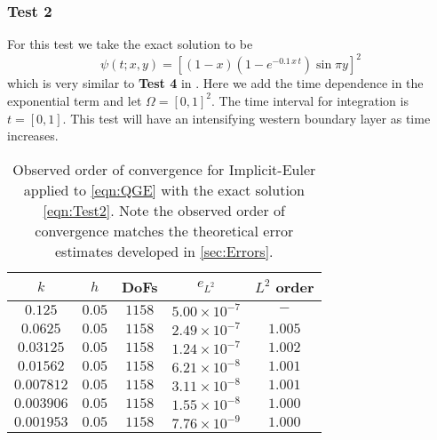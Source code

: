 \subsubsection*{Test 2}
For this test we take the exact solution to be
\begin{equation}
  \psi(t;x,y) = \left[(1-x)\left(1-e^{-0.1\,x\,t}\right) \sin \pi y\right]^2
  \label{eqn:Test2}
\end{equation}
which is very similar to \textbf{Test 4} in \cite{Foster}. Here we add the time
dependence in the exponential term and let $\Omega = [0,1]^2$. The time interval
for integration is $t = [0,1]$. This test will have an intensifying western
boundary layer as time increases.
\begin{table}
\begin{center}
  \begin{tabular}{|c|c|c|c|c|}
    \hline
    $k$ & $h$ & DoFs & $e_{L^2}$ & $L^2$ order \\%
    \hline
$0.125$ & $0.05$ & $1158$ & $5.00\times 10^{-7}$ & $-$ \\%
$0.0625$ & $0.05$ & $1158$ & $2.49\times 10^{-7}$ & $1.005$ \\%
$0.03125$ & $0.05$ & $1158$ & $1.24\times 10^{-7}$ & $1.002$ \\%
$0.01562$ & $0.05$ & $1158$ & $6.21\times 10^{-8}$ & $1.001$ \\%
$0.007812$ & $0.05$ & $1158$ & $3.11\times 10^{-8}$ & $1.001$ \\%
$0.003906$ & $0.05$ & $1158$ & $1.55\times 10^{-8}$ & $1.000$ \\%
$0.001953$ & $0.05$ & $1158$ & $7.76\times 10^{-9}$ & $1.000$ \\%
    \hline
  \end{tabular}
\end{center}
  \caption{Observed order of convergence for Implicit-Euler applied to
    \eqref{eqn:QGE} with the exact solution \eqref{eqn:Test2}. Note the observed
    order of convergence matches the theoretical error estimates developed in
    \autoref{sec:Errors}.}
  \label{tab:Test2}
\end{table}

